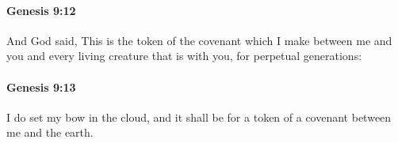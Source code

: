 		\paragraph{Genesis 9:12} %
			\label{GENESIS-9-12}

			And God said, This is the token of the covenant which I make between me and you and every living creature that is with you, for perpetual generations:


		\paragraph{Genesis 9:13} %
			\label{GENESIS-9-13}

			I do set my bow in the cloud, and it shall be for a token of a covenant between me and the earth.


